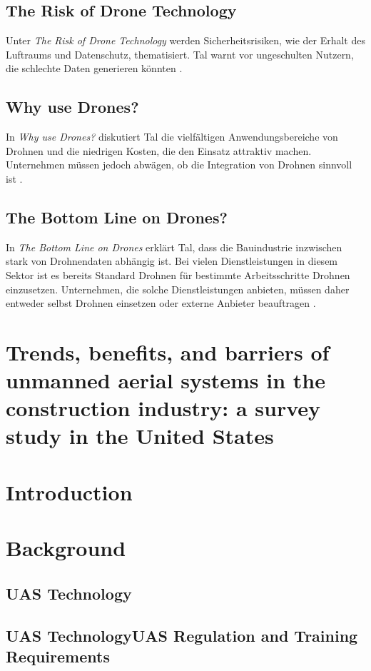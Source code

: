 \subsection{The Risk of Drone Technology}
Unter \textit{The Risk of Drone Technology} werden Sicherheitsrisiken, wie der Erhalt des Luftraums und Datenschutz, thematisiert.
Tal warnt vor ungeschulten Nutzern, die schlechte Daten generieren könnten \cite[pp. 17-18]{Tal2021} \cite[p. 20]{Tal2021}.

\subsection{Why use Drones?}
In \textit{Why use Drones?} diskutiert Tal die vielfältigen Anwendungsbereiche von Drohnen und die niedrigen Kosten, die den Einsatz attraktiv machen. Unternehmen müssen jedoch abwägen, ob die Integration von Drohnen sinnvoll ist \cite[p. 21]{Tal2021}.

\subsection{The Bottom Line on Drones?}
In \textit{The Bottom Line on Drones} erklärt Tal, dass die Bauindustrie inzwischen stark von Drohnendaten abhängig ist.
Bei vielen Dienstleistungen in diesem Sektor ist es bereits Standard Drohnen für bestimmte Arbeitsschritte Drohnen einzusetzen.
Unternehmen, die solche Dienstleistungen anbieten, müssen daher entweder selbst Drohnen einsetzen oder externe Anbieter beauftragen \cite[p. 22]{Tal2021}.



\section{Trends, benefits, and barriers of unmanned aerial systems in the construction industry: a survey study in the {United States}}

\section{Introduction}
\section{Background}
\subsection{UAS Technology}
\subsection{UAS TechnologyUAS Regulation and Training Requirements}
